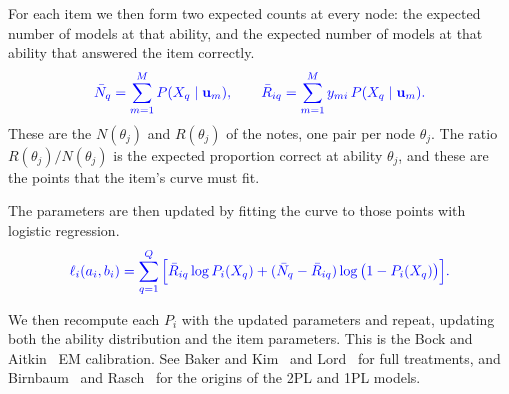 For each item we then form two expected counts at every node: the expected number
of models at that ability, and the expected number of models at that ability that
answered the item correctly. 
\begin{equation}
  \textcolor{blue}{\bar{N}_q = \sum_{m=1}^{M} P(X_q \mid \mathbf{u}_m),
  \qquad
  \bar{R}_{iq} = \sum_{m=1}^{M} y_{mi}\, P(X_q \mid \mathbf{u}_m) .}
  \label{eq:expected-counts}
\end{equation}
These are the $N(\theta_j)$ and $R(\theta_j)$ of the notes, one pair per node
$\theta_j$. The ratio $R(\theta_j) / N(\theta_j)$ is the expected proportion
correct at ability $\theta_j$, and these are the points that the item's curve
must fit. 

The parameters are then updated by fitting the curve to those points with
logistic regression. 
\begin{equation}
  \textcolor{blue}{\ell_i(a_i, b_i)
  = \sum_{q=1}^{Q} \Big[ \bar{R}_{iq} \log P_i(X_q)
    + (\bar{N}_q - \bar{R}_{iq}) \log\big(1 - P_i(X_q)\big) \Big] .}
  \label{eq:mstep}
\end{equation}

We then recompute each $P_i$ with the updated parameters and repeat, updating both
the ability distribution and the item parameters. 
This is the Bock and Aitkin~\cite{bock1981marginal} EM calibration. See Baker and
Kim~\cite{baker2004item} and Lord~\cite{lord1980irt} for full
treatments, and Birnbaum~\cite{birnbaum1968} and
Rasch~\cite{rasch1960} for the origins of the 2PL and 1PL models.

